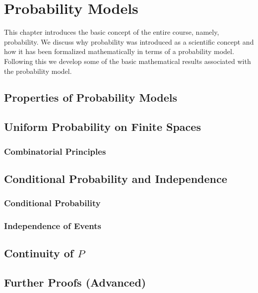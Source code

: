 \chapter{Probability Models}\label{chap:probability_models}
\minitoc
This chapter introduces the basic concept of the entire course, namely, probability. We discuss why probability was introduced as a scientific concept and how it has been formalized mathematically in terms of a probability model. Following this we develop some of the basic mathematical results associated with the probability model.





\section{Properties of Probability Models}
\lipsum[1-10]

\section{Uniform Probability on Finite Spaces}\label{unif_prob_fint_spc}
\lipsum[1-10]

\subsection{Combinatorial Principles}
\lipsum[1-10]

\section{Conditional Probability and Independence}\label{cond_prob_indp}
\lipsum[1-10]

\subsection{Conditional Probability}
\lipsum[1-10]

\subsection{Independence of Events}
\lipsum[1-10]

\section{Continuity of $P$}
\lipsum[1-10]

\section{Further Proofs (Advanced)}
\lipsum[1-10]